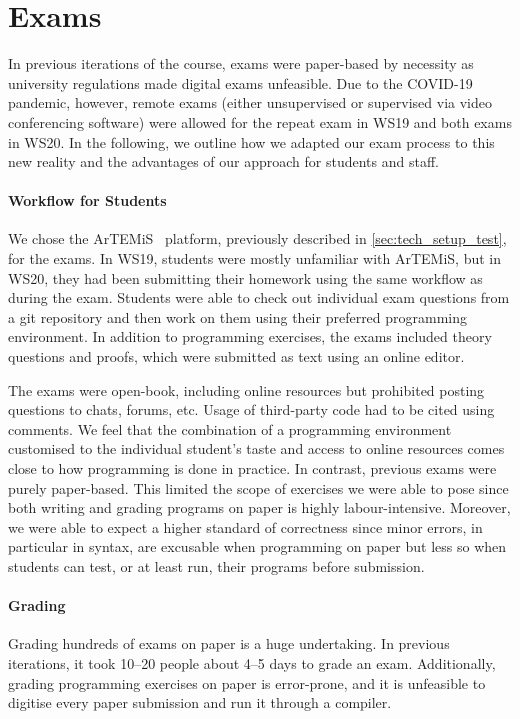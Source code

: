 \section{Exams}\label{sec:exam}
In previous iterations of the course, exams were paper-based by necessity as university regulations made digital exams unfeasible.
Due to the COVID-19 pandemic, however, remote exams (either unsupervised or supervised via video conferencing software) were allowed for the repeat exam in WS19 and both exams in WS20.
In the following, we outline how we adapted our exam process to this new reality and the advantages of our approach for students and staff.

\paragraph{Workflow for Students}

We chose the ArTEMiS~\cite{artemis} platform, previously described in \cref{sec:tech_setup_test}, for the exams.
In WS19, students were mostly unfamiliar with ArTEMiS,
but in WS20, they had been submitting their homework using the same workflow as during the exam.
Students were able to check out individual exam questions from a git repository and then work on them using their preferred programming environment.
In addition to programming exercises, the exams included theory questions and proofs, which were submitted as text using an online editor.

The exams were open-book, including online resources
but prohibited posting questions to chats, forums, etc.
Usage of third-party code had to be cited using comments.
We feel that the combination of a programming environment customised to the individual student's taste and access to online resources comes close to how programming is done in practice.
In contrast, previous exams were purely paper-based.
This limited the scope of exercises we were able to pose
since both writing and grading programs on paper is highly labour-intensive.
Moreover, we were able to expect a higher standard of correctness
since minor errors, in particular in syntax, are excusable when programming on paper but less so when students can test, or at least run, their programs before submission.

\paragraph{Grading}
Grading hundreds of exams on paper is a huge undertaking.
In previous iterations,
it took 10--20 people about 4--5 days to grade an exam.
Additionally, grading programming exercises on paper is error-prone, and it is unfeasible to digitise every paper submission and run it through a compiler.

